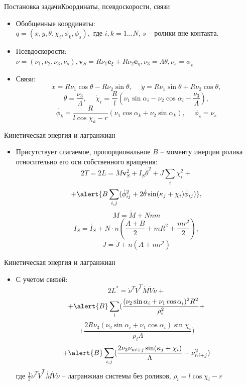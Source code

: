 \documentclass{beamer}
\renewcommand{\vec}[1]{\boldsymbol{\mathbf{#1}}}
\begin{document}
\begin{frame}{Постановка задачи}{Координаты, псевдоскорости, связи}
  \begin{itemize}
  \item {
    Обобщенные координаты: \\
    $q = (x, y, \theta, \chi_i, \phi_k, \phi_s),$ где $i,k = 1\dots N$, $s$ -- ролики вне контакта.
  }
  \item{
    Псевдоскорости:\\
    $\nu = (\nu_1, \nu_2, \nu_3, \nu_s), \vec{v}_S = R\nu_1\vec{e}_\xi + R\nu_2\vec{e}_\eta, \nu_3 = \Lambda\dot{\theta}, \nu_s = \dot{\phi}_s$
  }
  \item {
    Связи:
	$$ \dot{x} = R \nu_1\cos\theta-R\nu_2\sin\theta, \hspace{15pt} \dot{y} = R\nu_1\sin\theta+R\nu_2\cos\theta,$$
	$$\dot{\theta} = \frac{\nu_3}{\Lambda}, \hspace{15pt} \dot{\chi}_i = \frac{R}{l}(\nu_1\sin\alpha_i - \nu_2\cos\alpha_i - \frac{\nu_3}{\Lambda}), $$
	$$ \dot{\phi_k} = \frac{R}{l\cos\chi_k-r}(\nu_1\cos\alpha_k + \nu_2\sin\alpha_k), \hspace{15pt} \dot{\phi}_s = \nu_s $$
  }

  \end{itemize}
\end{frame}

\begin{frame}{Кинетическая энергия и лагранжиан}
  \begin{itemize}
  \item {
    Присутствует слагаемое, пропорциональное $B$ -- моменту инерции ролика относительно его оси собственного вращения:
    $$ 2T = 2L = M\vec{v}_S^2 + I_S\dot{\theta}^2 + J\sum_i\dot{\chi}_i^2 + $$
    $$ + \alert{B\sum_{i,j}(\dot{\phi}_{ij}^2 + 2\dot{\theta}\sin(\kappa_j + \chi_i)\dot{\phi}_{ij})}, $$
    $$ M = \mathring{M} + Nnm $$
    $$ I_S = \mathring{I_S} + N\cdot n(\frac{A+B}{2} + mR^2 + \frac{mr^2}{2}), $$
    $$ J = \mathring{J} + n(A + mr^2) $$
  }

  \end{itemize}
\end{frame}

\begin{frame}{Кинетическая энергия и лагранжиан}
  \begin{itemize}
  \item {
    С учетом связей:
    $$ 2L^{*} = \mathring{\nu}^T \mathring{V}^T \mathring{M} \mathring{V} \mathring{\nu} + $$
    $$ + \alert{B}\sum_{i}(
    	\frac{(\nu_2\sin\alpha_i+\nu_1\cos\alpha_i)^2R^2}
    	{\rho_i^2} + $$
    $$ +
    	\frac{2R\nu_3(\nu_2\sin\alpha_i+\nu_1\cos\alpha_i)\sin\chi_i}
    	{\rho_i\Lambda}
    ) $$
    $$ +
    \alert{B}\sum_{i,j}(
    	\frac{2\nu_3\nu_{ni+j}\sin(\kappa_j+\chi_i)}
    	{\Lambda}
    	+
    	\nu_{ni+j}^2
    )
    $$
    где $ \frac{1}{2}\mathring{\nu}^T \mathring{V}^T \mathring{M} \mathring{V} \mathring{\nu} $ -- лагранжиан системы без роликов, $\rho_i = l\cos\chi_i - r$
  }

  \end{itemize}
\end{frame}
\end{document}
